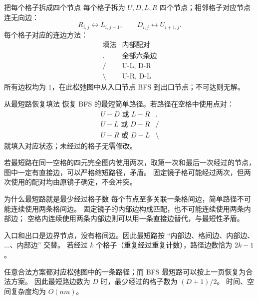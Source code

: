 \documentclass{beamer}
\begin{document}
{{\begin{frame}{把每个格子拆成四个节点}
  每个格子拆为 $U,D,L,R$ 四个节点；相邻格子对应节点连无向边：
  \[
    R_{i,j}\leftrightarrow L_{i,j+1},\qquad
    D_{i,j}\leftrightarrow U_{i+1,j}.
  \]
  每个格子对应的连边方法：
\[
  \begin{array}{c|c}
    \text{填法}&\text{内部配对}\\ \hline
    \text{.}&\text{全部六条边}\\
    \text{/}&\text{U-L, D-R}\\
    \text{\textbackslash}&\text{U-R, D-L}
  \end{array}
  \]
    所有边权均为 $1$，在此松弛图中从入口节点 BFS 到出口节点；不可达则无解。
\end{frame}

\begin{frame}{从最短路恢复填法}
  恢复 BFS 的最短简单路径。若路径在空格中使用点对：
  \[
  \begin{array}{c|c}
    U-D\text{ 或 }L-R&\texttt{.}\\
    U-L\text{ 或 }D-R&\texttt{/}\\
    U-R\text{ 或 }D-L&\text{\textbackslash}
  \end{array}
  \]
  就填入对应状态；未经过的格子无需修改。

  \vspace{0.5em}
  若最短路在同一空格的四元完全图内使用两次，取第一次和最后一次经过的节点，
  图中一定有直接边，可以严格缩短路径，矛盾。
    固定镜子格可能经过两次，但两次使用的配对均由原镜子确定，不会冲突。
  \end{frame}

  \begin{frame}{为什么最短路就是最少经过格子数}
    每个节点至多关联一条格间边，简单路径不可能连续使用两条格间边。
    固定镜子的内部边构成匹配，也不可能连续使用两条内部边；
    空格内连续使用两条内部边则可以用一条直接边替代，与最短性矛盾。

    \vspace{0.5em}
    入口和出口是边界节点，没有格间边。因此最短路按
    ``内部边、格间边、内部边、$\ldots$、内部边'' 交替。
    若经过 $k$ 个格子（重复经过重复计数），路径边数恰为 $2k-1$。

    \vspace{0.5em}
    任意合法方案都对应松弛图中的一条路径；而 BFS 最短路可以按上一页恢复为合法方案。
    因此最短路边数为 $D$ 时，最少经过的格子数为 $(D+1)/2$。
    时间、空间复杂度均为 $O(nm)$。
\end{frame}
}
{
}}
\end{document}
